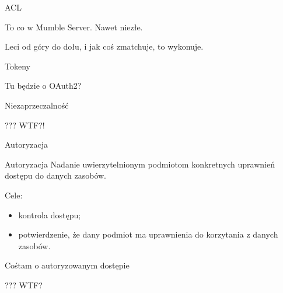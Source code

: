 \begin{frame}{ACL}
	
	To co w Mumble Server. Nawet niezłe.
	
	Leci od góry do dołu, i jak coś zmatchuje, to wykonuje.
	
\end{frame}

\begin{frame}{Tokeny}
	
	Tu będzie o OAuth2?
	
\end{frame}

\begin{frame}{Niezaprzeczalność}
	
	??? WTF?!
	
\end{frame}

\begin{frame}{Autoryzacja}
	
	\begin{alertblock}{Autoryzacja}
		Nadanie uwierzytelnionym podmiotom konkretnych uprawnień dostępu do danych zasobów.
	\end{alertblock}
	
	Cele:
	\begin{itemize}
		\item kontrola dostępu;
		\item potwierdzenie, że dany podmiot ma uprawnienia do korzytania z danych zasobów.
	\end{itemize}
	
\end{frame}

\begin{frame}{Cośtam o autoryzowanym dostępie}
	
	??? WTF?
	
\end{frame}


